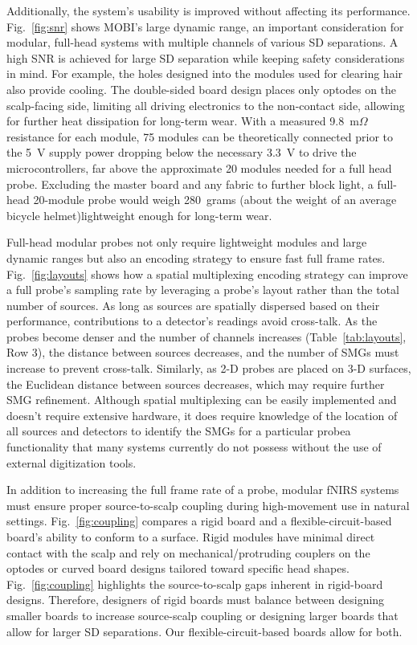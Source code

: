 Additionally, the system's usability is improved without affecting its performance. Fig.~\ref{fig:snr} shows MOBI's large dynamic range, an important consideration for modular, full-head systems with multiple channels of various SD separations. A high SNR is achieved for large SD separation while keeping safety considerations in mind. For example, the holes designed into the modules used for clearing hair also provide cooling. The double-sided board design places only optodes on the scalp-facing side, limiting all driving electronics to the non-contact side, allowing for further heat dissipation for long-term wear. With a measured 9.8~m$\Omega$ resistance for each module, 75 modules can be theoretically connected prior to the 5~V supply power dropping below the necessary 3.3~V to drive the microcontrollers, far above the approximate 20 modules needed for a full head probe. Excluding the master board and any fabric to further block light, a full-head 20-module probe would weigh 280~grams (about the weight of an average bicycle helmet)\textemdash lightweight enough for long-term wear. %

Full-head modular probes not only require lightweight modules and large dynamic ranges but also an encoding strategy to ensure fast full frame rates. Fig.~\ref{fig:layouts} shows how a spatial multiplexing encoding strategy can improve a full probe's sampling rate by leveraging a probe's layout rather than the total number of sources. As long as sources are spatially dispersed based on their performance, contributions to a detector's readings avoid cross-talk. As the probes become denser and the number of channels increases (Table~\ref{tab:layouts}, Row 3), the distance between sources decreases, and the number of SMGs must increase to prevent cross-talk. Similarly, as 2-D probes are placed on 3-D surfaces, the Euclidean distance between sources decreases, which may require further SMG refinement. Although spatial multiplexing can be easily implemented and doesn't require extensive hardware, it does require knowledge of the location of all sources and detectors to identify the SMGs for a particular probe\textemdash a functionality that many systems currently do not possess without the use of external digitization tools.  

In addition to increasing the full frame rate of a probe, modular fNIRS systems must ensure proper source-to-scalp coupling during high-movement use in natural settings. Fig.~\ref{fig:coupling} compares a rigid board and a flexible-circuit-based board's ability to conform to a surface. Rigid modules have minimal direct contact with the scalp and rely on mechanical/protruding couplers on the optodes or curved board designs tailored toward specific head shapes. Fig.~\ref{fig:coupling} highlights the source-to-scalp gaps inherent in rigid-board designs. Therefore, designers of rigid boards must balance between designing smaller boards to increase source-scalp coupling or designing larger boards that allow for larger SD separations. Our flexible-circuit-based boards allow for both. 

